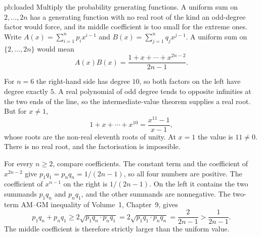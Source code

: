 \begin{solution}{pb:loaded}
\idea Multiply the probability generating functions. A uniform sum on $2,\ldots,2n$ has a generating function with no real root of the kind an odd-degree factor would force, and its middle coefficient is too small for the extreme ones.
\writeup Write $A(x)=\sum_{i=1}^n p_i x^{i-1}$ and $B(x)=\sum_{j=1}^n q_j x^{j-1}$. A uniform sum on $\{2,\ldots,2n\}$ would mean
\[
 A(x)B(x)=\frac{1+x+\cdots+x^{2n-2}}{2n-1}.
\]

For $n=6$ the right-hand side has degree $10$, so both factors on the left have degree exactly $5$. A real polynomial of odd degree tends to opposite infinities at the two ends of the line, so the intermediate-value theorem supplies a real root. But for $x\ne1$,
\[
 1+x+\cdots+x^{10}=\frac{x^{11}-1}{x-1},
\]
whose roots are the non-real eleventh roots of unity. At $x=1$ the value is $11\ne0$. There is no real root, and the factorisation is impossible.

For every $n\ge2$, compare coefficients. The constant term and the coefficient of $x^{2n-2}$ give $p_1q_1=p_nq_n=1/(2n-1)$, so all four numbers are positive. The coefficient of $x^{n-1}$ on the right is $1/(2n-1)$. On the left it contains the two summands $p_1q_n$ and $p_nq_1$, and the other summands are nonnegative. The two-term AM--GM inequality of Volume~1, Chapter~9, gives
\[
 p_1q_n+p_nq_1\ge2\sqrt{p_1q_n\cdot p_nq_1}=2\sqrt{p_1q_1\cdot p_nq_n}=\frac2{2n-1}>\frac1{2n-1}.
\]
The middle coefficient is therefore strictly larger than the uniform value.
\end{solution}

